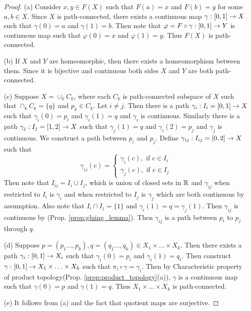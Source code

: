 \documentclass[11pt,a4paper]{article}
\begin{document}
\begin{proof}
\noindent(a) Consider $x,y\in F(X)$ such that $F(a) = x$ and $F(b) = y$ for some $a,b\in X$. Since $X$ is path-connected, there exists a continuous map $\gamma:[0,1]\rightarrow X$ such that $\gamma(0) = a$ and $\gamma(1) = b$. Then note that $\varphi = F\circ\gamma:[0,1]\rightarrow Y$ is continuous map such that $\varphi(0) = x$ and $\varphi(1) = y$. Thus $F(X)$ is path-connected.

\noindent(b) If $X$ and $Y$ are homeomorphic, then there exists a homeomorphism between them. Since it is bijective and continuous both sides $X$ and $Y$ are both path-connected.

\noindent(c) Suppose $X = \cup_k C_k$, where each $C_k$ is path-connected subspace of $X$ such that $\cap_k C_k = \{q\}$ and $p_k\in C_k$. Let $i\neq j$. Then there is a path $\gamma_i:I_i = [0,1]\rightarrow X$ such that $\gamma_i(0) = p_i$ and $\gamma_i(1) = q$ and $\gamma_i$ is continuous. Similarly there is a path $\gamma_j:I_j = [1,2]\rightarrow X$ such that $\gamma_j(1) = q$ and $\gamma_i(2) = p_j$ and $\gamma_j$ is continuous. We construct a path between $p_i$ and $p_j$. Define $\gamma_{ij}:I_{ij} = [0,2]\rightarrow X$ such that
\[
\gamma_{ij}(c) = 
\begin{cases}
\gamma_i(c), \text{ if }c \in I_i  \\
\gamma_j(c), \text{ if }c \in I_j  
\end{cases}
\]
Then note that $I_{ij} = I_i\cup I_j$, which is union of closed sets in $\mathbb{R}$ and $\gamma_{ij}$ when restricted to $I_i$ is $\gamma_i$ and when restricted to $I_j$ is $\gamma_j$ which are both continuous by assumption. Also note that $I_i\cap I_j = \{1\}$ and $\gamma_i(1) = q = \gamma_j(1)$. Then $\gamma_{ij}$ is continuous by (Prop. \ref{prop:gluing_lemma}). Then $\gamma_{ij}$ is a path between $p_i$ to $p_j$ through $q$. 

\noindent(d) Suppose $p = (p_1\ldots,p_k), q = (q_1\ldots,q_k)\in X_1\times\ldots\times X_k$. Then there exists a path $\gamma_i:[0,1]\rightarrow X_i$ such that $\gamma_i(0) = p_i$ and $\gamma_i(1) = q_i$. Then construct $\gamma:[0,1]\rightarrow X_1\times\ldots\times X_k$ such that $ \pi_i\circ\gamma = \gamma_i$. Then by Characteristic property of product topology(Prop. \ref{prop:product_topology}(a)), $\gamma$ is a continuous map such that $\gamma(0) = p$ and $\gamma(1) = q$. Thus $X_1\times\ldots\times X_k$ is path-connected.

\noindent(e) It follows from (a) and the fact that quotient maps are surjective.


\end{proof}
\end{document}
